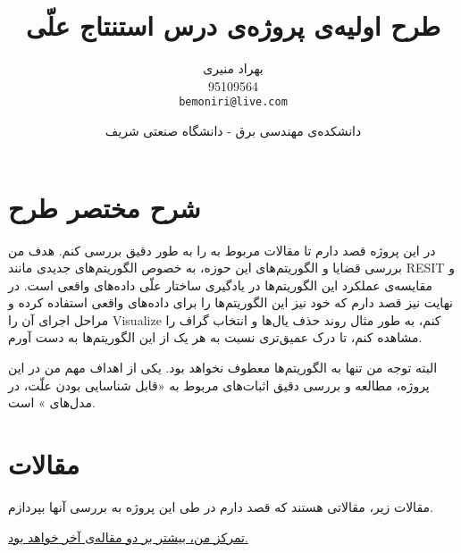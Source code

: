\documentclass{article}
\title{طرح اولیه‌ی پروژه‌ی درس استنتاج علّی\\
\vspace{0.5cm}
\textbf{\lr{A Review on Additive Noise Models:\\ Theorems and Learning Algorithms}}
}
\author{بهراد منیری\\95109564\\ \texttt{bemoniri@live.com}}
\date{دانشکده‌ی مهندسی برق - دانشگاه صنعتی شریف}
\begin{document}
\maketitle
\section{شرح مختصر طرح}

در این پروژه قصد دارم تا  مقالات مربوط به 
را به طور دقیق بررسی کنم. هدف من بررسی  قضایا و الگوریتم‌های این حوزه، به خصوص الگوریتم‌های جدیدی مانند RESIT و مقایسه‌ی عملکرد این الگوریتم‌ها در یادگیری ساختار علّی داده‌های واقعی است. در نهایت نیز قصد دارم که خود نیز این الگوریتم‌ها را برای داده‌های واقعی استفاده کرده و مراحل  اجرای آن را Visualize  کنم، به طور مثال روند حذف یال‌ها  و انتخاب گراف را مشاهده کنم،‌ تا درک عمیق‌تری نسبت به هر یک از این الگوریتم‌ها به دست آورم.

 البته توجه من تنها به الگوریتم‌ها معطوف نخواهد بود. یکی از اهداف مهم من در این پروژه، مطالعه و بررسی دقیق اثبات‌های مربوط به «قابل شناسایی بودن علّت، در مدل‌های
»
است.

\indent
\section{مقالات}
	مقالات زیر، مقالاتی هستند که قصد دارم در طی این پروژه به بررسی آنها بپردازم.

\underline{تمرکز من، بیشتر بر دو مقاله‌ی آخر خواهد بود.}
\end{document}
